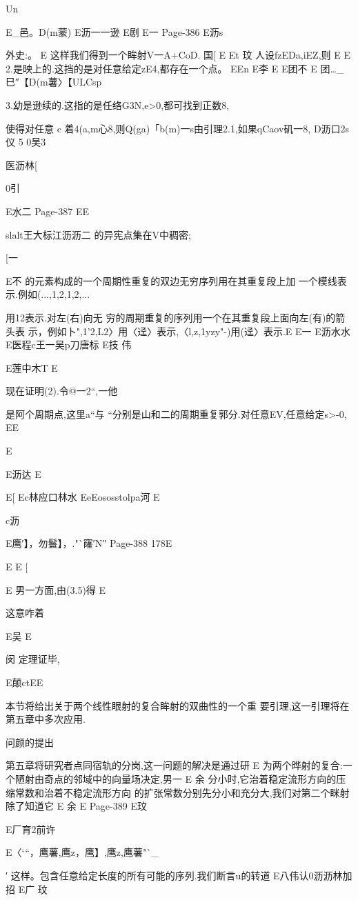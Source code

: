{{{{{{{{{{{{{{{Un

E_邑。D(m蒙)
E沥一一逊
E剧
E一
Page-386
E沥s

外史:。
E
这样我们得到一个眸射V一A+CoD.
国[
E
Et
玟
人设fzEDa,iEZ,则
E
E
2.是映上的.这挡的是对任意给定zE4,都存在一个点。
EEn
E李
E
E团不
E
团…_巳″【D(m薯〉【ULCsp

3.幼是逊续的.这指的是任络G3N,e>0,都可找到正数8,

使得对任意
c
着4(a,m心8,则Q(ga)「b(m)一s由引理2.1,如果qCaov矶一8,
D沥口2s仪
5
0吴3

医沥林[

0引

E水二
Page-387
EE

slalt王大标江沥沥二
的异宪点集在V中稠密;

[一

E不
的元素构成的一个周期性重复的双边无穷序列用在其重复段上加
一个模线表示.例如(...,1,2,1,2,...}用{12}表示.对左(右)向无
穷的周期重复的序列用一个在其重复段上面向左(有)的箭头表
示，例如卜",1'2,L2〉用〈迳〉表示,〈l,z,1yzy"-)用(迳〉表示.E
E一
E沥水水
E医程c王一吴p刀唐标
E技
伟

E莲中木T
E

现在证明(2).令@一{2“},一他}是阿个周期点,这里a“与
“分别是山和二的周期重复郭分.对任意EV,任意给定s>-0,
EE

E

E沥达
E

E[
Ec林应口林水
EeEososstolpa河
E

c沥

E{鹰′】，勿鬟】，."`窿′N′}′
Page-388
178E

E
E
[

E
男一方面,由(3.5)得
E

这意咋着

E吴
E

闵
定理证毕,

E颠ctEE

本节将给出关于两个线性眼射的复合眸射的双曲性的一个重
要引理,这一引理将在第五章中多次应用.

问颜的提出

第五章将研究者点同宿轨的分岗,这一问题的解决是通过研
E
为两个晔射的复合:一个陋射由奇点的邻域中的向量场决定,男一
E
余
分小时,它治着稳定流形方向的压缩常数和治着不稳定流形方向
的扩张常数分别先分小和充分大,我们对第二个眯射除了知道它
E
余
E
Page-389
E玟

E厂育2前许

E〈`“，鹰薯,鹰z，鹰】,鹰z,鹰薯"`_}′
这样。包含任意给定长度的所有可能的序列.我们断言u的转道
E八伟认0沥沥林加招
E广
玟

}}}}}}}}}}}}

